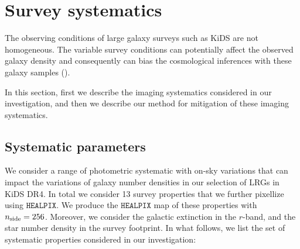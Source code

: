 \documentclass[fleqn,usenatbib,useAMS]{mnras}
\newcommand{\healpix}{\mathtt{HEALPIX}}
\begin{document}
\section{Survey systematics}\label{sec:systematic}

The observing conditions of large galaxy surveys such as KiDS are not homogeneous. 
The variable survey conditions can potentially affect the observed galaxy density and consequently can 
bias the cosmological inferences with these galaxy samples (\citealt{ross2012clustering, leistedt2014, leistedt2016mapping, zhai2017clustering, elvin2017, bautista2018sdss, crocce2019dark, DESI_systematic, rezaie2019, icaza2020clustering}). 

In this section, first we describe the imaging systematics considered in our investigation, and then we describe our method for mitigation of these imaging systematics.


\subsection{Systematic parameters}

We consider a range of photometric systematic with on-sky variations that can impact the variations of galaxy number densities in our selection of LRGs in KiDS DR4. In total we consider 13 survey properties that we further pixellize using $\healpix$. We produce the $\healpix$ map of these properties with $n_{\rm side} = 256$. Moreover, we consider the galactic extinction in the $r$-band, and the star number density in the survey footprint. In what follows, we list the set of systematic properties considered in our investigation:
\end{document}
